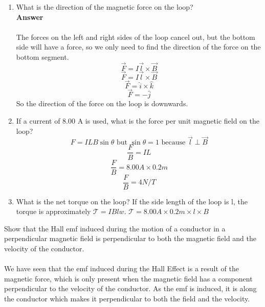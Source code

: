 \documentclass[9pt,addpoints]{exam}
\begin{document}
\begin{questions}
\begin{center}
		\end{center}
		\begin{enumerate}[label=(\roman*)]
			\item What is the direction of the magnetic force on the loop?  \\ 
			\textbf{Answer} \\ \\
			The forces on the left and right sides of the loop cancel out, but the bottom side will have a force, so we only need to find the direction of the force on the bottom segment.
			$$\vec{F}=I\vec{l}\times\vec{B}$$
			$$\vec{F}=I\vec{l}\times\vec{B}$$
			$$\vec{F}=\hat{i}\times\hat{k}$$
			$$\vec{F}=-\hat{j}$$
			So the direction of the force on the loop is downwards.	
			\item If a current of 8.00 A is used, what is the force per unit magnetic field on the loop?
			$$F=ILB\sin\theta\text{ but }\sin\theta=1\text{ because }\vec{l}\perp\vec{B}$$
			$$\dfrac{F}{B}=IL$$
			$$\dfrac{F}{B}=8.00A\times0.2m$$
			$$\dfrac{F}{B}=4N/T$$
			\item What is the net torque on the loop?
			If the side length of the loop is l, the torque is approximately $\mathcal{T}=IBlw$.
			$\mathcal{T}=8.00A\times0.2m\times l\times B$
		\end{enumerate}
		\question Show that the Hall emf induced during the motion of a conductor in a perpendicular magnetic field is perpendicular to both the magnetic field and the velocity of the conductor. \\ \\
		We have seen that the emf induced during the Hall Effect is a result of the magnetic force, which is only present when the magnetic field has a component perpendicular to the velocity of the conductor. As the emf is induced, it is along the conductor which makes it perpendicular to both the field and the velocity.

\end{questions}
\end{document}
